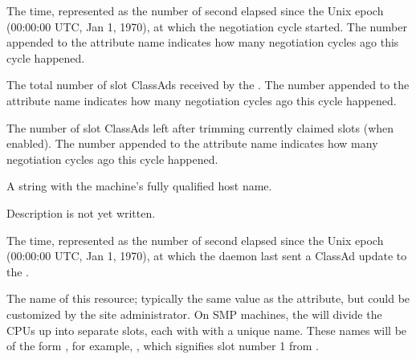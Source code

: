 \begin{description}
\label{attr:LastNegotiationCycleTime<X>}
\item[\AdAttr{LastNegotiationCycleTime<X>}:] 
The time, represented as the number of second elapsed since the Unix
epoch (00:00:00 UTC, Jan 1, 1970), at which the negotiation cycle started.
The number  appended to the attribute name
indicates how many negotiation cycles ago this cycle happened.

\label{attr:LastNegotiationCycleTotalSlots<X>}
\item[\AdAttr{LastNegotiationCycleTotalSlots<X>}:] 
The total number of slot ClassAds received by the .
The number  appended to the attribute name indicates 
how many negotiation cycles ago this cycle happened.

\label{attr:LastNegotiationCycleTrimmedSlots<X>}
\item[\AdAttr{LastNegotiationCycleTrimmedSlots<X>}:] 
The number of slot ClassAds left after trimming currently claimed slots 
(when enabled).
The number  appended to the attribute name indicates 
how many negotiation cycles ago this cycle happened.

\item[\AdAttr{Machine}:] A string with the machine's fully qualified 
host name.

\item[\AdAttr{MyAddress}:] Description is not yet written.

\item[\AdAttr{MyCurrentTime}:]  The time, represented as the number of 
second elapsed since the Unix epoch (00:00:00 UTC, Jan 1, 1970),
at which the  daemon last sent a ClassAd update to the
.

\item[\AdAttr{Name}:] The name of this resource; typically the same value as
the  attribute, but could be customized by the site
administrator.
On SMP machines, the  will divide the CPUs up into separate
slots, each with with a unique name.
These names will be of the form , for example,
, which signifies slot number 1 from
.


\end{description}
